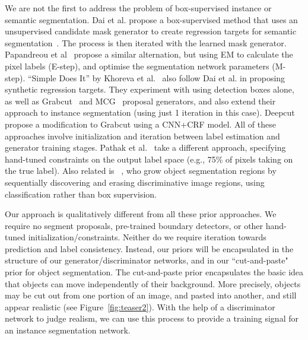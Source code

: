 \documentclass[runningheads]{llncs}
\begin{document}
We are not the first to address the problem of box-supervised instance or semantic segmentation. Dai et al. propose a box-supervised method that uses an unsupervised candidate mask generator to create regression targets for semantic segmentation~\cite{dai2015boxsup}. The process is then iterated with the learned mask generator. Papandreou et al~\cite{papandreou2015weakly} propose a similar alternation, but using EM to calculate the pixel labels (E-step), and optimise the segmentation network parameters (M-step). ``Simple Does It'' by Khoreva et al.~\cite{khoreva2016simple} also follow Dai et al. in proposing synthetic regression targets. They experiment with using detection boxes alone, as well as Grabcut~\cite{rother2004grabcut} and MCG~\cite{pont2017multiscale} proposal generators, and also extend their approach to instance segmentation (using just 1 iteration in this case). Deepcut~\cite{rajchl2017deepcut} propose a modification to Grabcut using a CNN+CRF model. All of these approaches involve initialization and iteration between label estimation and generator training stages. Pathak et al.~\cite{pathak2015constrained} take a different approach, specifying hand-tuned constraints on the output label space (e.g., 75\% of pixels taking on the true label). Also related is ~\cite{wei2017object}, who grow object segmentation regions by sequentially discovering and erasing discriminative image regions, using classification rather than box supervision.

Our approach is qualitatively different from all these prior approaches. We require no segment proposals, pre-trained boundary detectors, or other hand-tuned initialization/constraints. Neither do we require iteration towards prediction and label consistency. Instead, our priors will be encapsulated in the structure of our generator/discriminator networks, and in our ``cut-and-paste" prior for object segmentation. 
The cut-and-paste prior encapsulates the basic idea that objects can move independently of their background. More precisely, objects may be cut out from one portion of an image, and pasted into another, and still appear realistic (see Figure~\ref{fig:teaser2}). With the help of a discriminator network to judge realism, we can use this process to provide a training signal for an instance segmentation network. 
\end{document}
